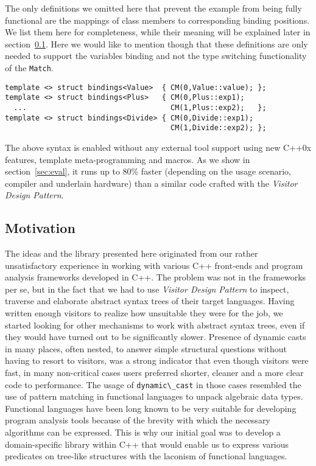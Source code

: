\documentclass[preprint]{sigplanconf}
\DeclareRobustCommand{\code}[1]{{\lstinline[breaklines=false]{#1}}}
\begin{document}
The only definitions we omitted here that prevent the example from being fully 
functional are the mappings of class members to corresponding binding positions. 
We list them here for completeness, while their meaning will be explained later 
in section~\ref{}. Here we would like to mention though that these definitions are only 
needed to support the variables binding and not the type switching functionality 
of the \code{Match}.

\begin{lstlisting}[keepspaces,columns=flexible]
template <> struct bindings<Value>  { CM(0,Value::value); };
template <> struct bindings<Plus>   { CM(0,Plus::exp1); 
  ...                                 CM(1,Plus::exp2);   };
template <> struct bindings<Divide> { CM(0,Divide::exp1); 
                                      CM(1,Divide::exp2); };
\end{lstlisting}

The above syntax is enabled without any external tool support using new C++0x 
features\cite{C++0x}, template meta-programming and macros. As we 
show in section~\ref{sec:eval}, it runs up to 80\% faster (depending on the usage 
scenario, compiler and underlain hardware) than a similar code crafted with the 
\emph{Visitor Design Pattern}.

\subsection{Motivation}


The ideas and the library presented here originated from our rather 
unsatisfactory experience in working with various C++ front-ends and program 
analysis frameworks developed in C++\cite{Pivot09,Phoenix,Clang,Lise}. The 
problem was not in the frameworks per se, but in the fact that we had to use 
\emph{Visitor Design Pattern}\cite{DesignPatterns1993} to inspect, traverse and 
elaborate abstract syntax trees of their target languages. Having written enough 
visitors to realize how unsuitable they were for the job, we started looking for 
other mechanisms to work with abstract syntax trees, even if they would have 
turned out to be significantly slower. 
Presence of dynamic casts in many places, often nested, to answer simple 
structural questions without having to resort to visitors, was a strong 
indicator that even though visitors were fast, in many non-critical cases 
users preferred shorter, cleaner and a more clear code to performance.
The usage of \code{dynamic\_cast} in those cases resembled the use of 
pattern matching in functional languages to unpack algebraic data types. 
Functional languages have been long known to be very suitable for developing 
program analysis tools because of the brevity with which the necessary 
algorithms can be expressed. This is why our initial goal was to develop a 
domain-specific library within C++ that would enable us to express various 
predicates on tree-like structures with the laconism of functional languages.
\end{document}
